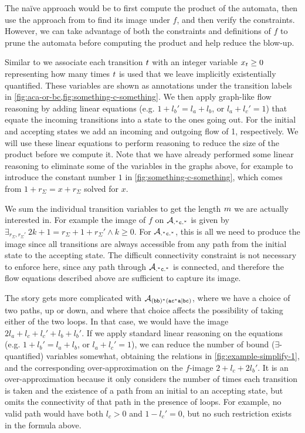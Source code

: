 \documentclass[acmsmall,review,anonymous,screen]{acmart}\settopmatter{printfolios=true,printccs=true,printacmref=true}
\theoremstyle{definition}
\begin{document}
The na\"ive approach would be to first compute the product of the automata, then
use the approach from \cite{generate-parikh-image} to find its image under $f$,
and then verify the constraints. However, we can take advantage of both the
constraints and definitions of $f$ to prune the automata before computing the
product and help reduce the blow-up.

Similar to \cite{generate-parikh-image} we associate each transition
$t$ with an integer variable $x_t \geq 0$
representing how many times $t$ is used that we leave implicitly
existentially quantified. These variables are shown as annotations under the
transition labels in \cref{fig:aca-or-bc,fig:something-c-something}. We then
apply graph-like flow reasoning by adding linear equations (e.g. $1 + {l_b}' =
l_a + l_b$, or $l_a + l_c' = 1$) that equate the incoming transitions into a
state to the ones going out. For the initial and accepting states we add an
incoming and outgoing flow of 1, respectively. We will use these linear
equations to perform reasoning to reduce the size of the product before we
compute it. Note that we have already performed some linear reasoning to
eliminate some of the variables in the graphs above, for example to introduce
the constant number $1$ in \cref{fig:something-c-something}, which comes from $1
+ r_\Sigma = x + r_\Sigma$ solved for $x$.

We sum the individual transition variables to get the length $m$ we
are actually interested in. For example the image of $f$ on
$\mathcal{A}_{\mathtt{.^\ast{}c.^\ast}}$ is given by $\exists_{r_\Sigma, r_\Sigma'} \: 2k + 1 =
r_\Sigma + 1 + r_\Sigma' \land k \geq 0$. For $\mathcal{A}_{\mathtt{.^\ast{}c.^\ast}}{}$, this is
all we need to produce the image since all transitions are always accessible
from any path from the initial state to the accepting state. The difficult
connectivity constraint is not necessary to enforce here, since any path through
$\mathcal{A}_{\mathtt{.^\ast{}c.^\ast}}{}$ is connected, and therefore the flow equations
described above are sufficient to capture its image.

The story gets more complicated with $\mathcal{A}_{\mathtt{(bb)^\ast(ac^\ast{}a|bc)}}{}$, where we have a choice of two
paths, up or down, and where that choice affects the possibility of taking
either of the two loops. In that case, we would have the image $2l_a + l_c + l_c' + l_b + l_b'$.
If we apply standard linear reasoning on the equations (e.g. $1 + {l_b}' = l_a +
l_b$, or $l_a + l_c' = 1$), we can reduce the number of bound
($\exists$-quantified) variables somewhat, obtaining the relations in
\cref{fig:example-simplify-1}, and the corresponding over-approximation on
the $f$-image $2 + l_c + 2l_b'$. It is an over-approximation because it only
considers the number of times each transition is taken and the existence of a
path from an initial to an accepting state, but omits the connectivity of that
path in the presence of loops. For example, no valid path would have both $l_c >
0$ and $1 - l_c' = 0$, but no such restriction exists in the formula above.
\end{document}

